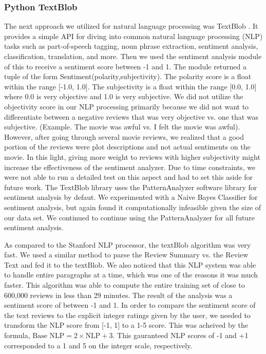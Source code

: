 \documentclass{article} %
\begin{document}
\subsubsection{Python TextBlob} The next approach we utilized for natural language processing was TextBlob \cite{TextBlob}. It provides a simple API for diving into common natural language processing (NLP) tasks such as part-of-speech tagging, noun phrase extraction, sentiment analysis, classification, translation, and more. Then we used the sentiment analysis module of this to receive a sentiment score between -1 and 1. The module returned a tuple of the form Sentiment(polarity,subjectivity). The polarity score is a float within the range [-1.0, 1.0]. The subjectivity is a float within the range [0.0, 1.0] where 0.0 is very objective and 1.0 is very subjective. We did not utilize the objectivity score in our NLP processing primarily because we did not want to differentiate between a negative reviews that was very objective vs. one that was subjective. (Example. The movie was awful vs. I felt the movie was awful).  However, after going through several movie reviews, we realized that a good portion of the reviews were plot descriptions and not actual sentiments on the movie. In this light, giving more weight to reviews with higher subjectivity might increase the effectiveness of the sentiment analyzer. Due to time constraints, we were not able to run a detailed test on this aspect and had to set this aside for future work. The TextBlob library uses the PatternAnalyzer software library for sentiment analysis by defaut. We experimented with a Naive Bayes Classifier for sentiment analysis, but again found it computationally infeasible given the size of our data set. We continued to continue using the PatternAnalyzer for all future sentiment analysis. 


As compared to the Stanford NLP processor, the textBlob algorithm was very fast. We used a similar method to parse the Review Summary vs. the Review Text and fed it to the textBlob. We also noticed that this NLP system was able to handle entire paragraphs at a time, which was one of the reasons it was much faster. This algorithm was able to compute the entire training set of close to 600,000 reviews in less than 29 minutes. The result of the analysis was a sentiment score of between -1 and 1. In order to compare the sentiment score of the text reviews to the explicit integer ratings given by the user, we needed to transform the NLP score from [-1, 1] to a 1-5 score. This was acheived by the formula, $\text{Base NLP} = 2 \times \text{NLP} + 3$. This gauranteed NLP scores of -1 and +1 corresponded to a 1 and 5 on the integer scale, respectively. 
\end{document}
